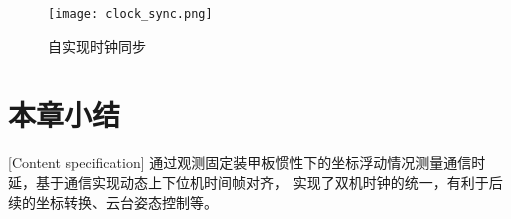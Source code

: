 \begin{figure}[H]
    \centering
    \texttt{[image: clock\_sync.png]} 
    \caption{自实现时钟同步} 
    \label{clock_sync}
\end{figure}









\section{本章小结}[Content specification]
通过观测固定装甲板惯性下的坐标浮动情况测量通信时延，基于通信实现动态上下位机时间帧对齐，
实现了双机时钟的统一，有利于后续的坐标转换、云台姿态控制等。






